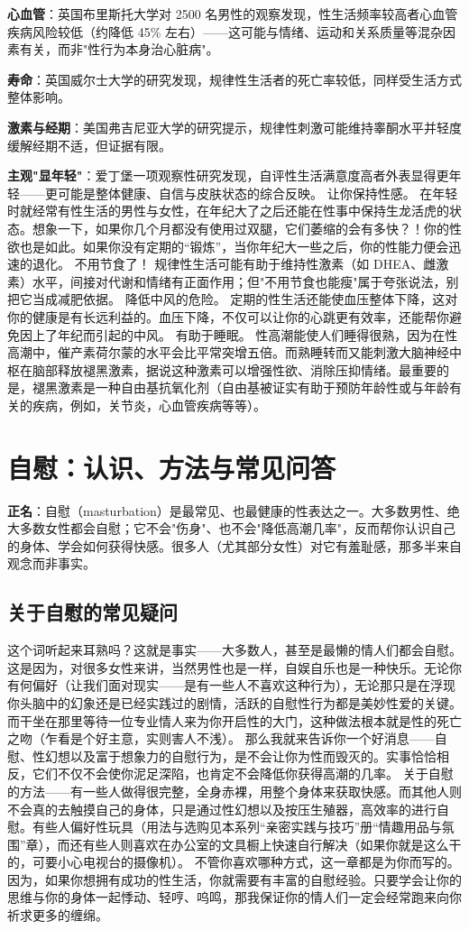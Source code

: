 \documentclass[12pt,UTF8,openany]{ctexbook}
\begin{document}
\textbf{心血管}：英国布里斯托大学对 2500 名男性的观察发现，性生活频率较高者心血管疾病风险较低（约降低 45\% 左右）——这可能与情绪、运动和关系质量等混杂因素有关，而非"性行为本身治心脏病"。

\textbf{寿命}：英国威尔士大学的研究发现，规律性生活者的死亡率较低，同样受生活方式整体影响。

\textbf{激素与经期}：美国弗吉尼亚大学的研究提示，规律性刺激可能维持睾酮水平并轻度缓解经期不适，但证据有限。

\textbf{主观"显年轻"}：爱丁堡一项观察性研究发现，自评性生活满意度高者外表显得更年轻——更可能是整体健康、自信与皮肤状态的综合反映。
让你保持性感。
在年轻时就经常有性生活的男性与女性，在年纪大了之后还能在性事中保持生龙活虎的状态。想象一下，如果你几个月都没有使用过双腿，它们萎缩的会有多快？！你的性欲也是如此。如果你没有定期的“锻炼”，当你年纪大一些之后，你的性能力便会迅速的退化。
不用节食了！
规律性生活可能有助于维持性激素（如 DHEA、雌激素）水平，间接对代谢和情绪有正面作用；但"不用节食也能瘦"属于夸张说法，别把它当成减肥依据。
降低中风的危险。
定期的性生活还能使血压整体下降，这对你的健康是有长远利益的。血压下降，不仅可以让你的心跳更有效率，还能帮你避免因上了年纪而引起的中风。
有助于睡眠。
性高潮能使人们睡得很熟，因为在性高潮中，催产素荷尔蒙的水平会比平常突增五倍。而熟睡转而又能刺激大脑神经中枢在脑部释放褪黑激素，据说这种激素可以增强性欲、消除压抑情绪。最重要的是，褪黑激素是一种自由基抗氧化剂（自由基被证实有助于预防年龄性或与年龄有关的疾病，例如，关节炎，心血管疾病等等）。

\section{自慰：认识、方法与常见问答}

\textbf{正名}：自慰（masturbation）是最常见、也最健康的性表达之一。大多数男性、绝大多数女性都会自慰；它不会"伤身"、也不会"降低高潮几率"，反而帮你认识自己的身体、学会如何获得快感。很多人（尤其部分女性）对它有羞耻感，那多半来自观念而非事实。

\subsection*{关于自慰的常见疑问}
这个词听起来耳熟吗？这就是事实——大多数人，甚至是最懒的情人们都会自慰。这是因为，对很多女性来讲，当然男性也是一样，自娱自乐也是一种快乐。无论你有何偏好（让我们面对现实——是有一些人不喜欢这种行为），无论那只是在浮现你头脑中的幻象还是已经实践过的剧情，活跃的自慰性行为都是美妙性爱的关键。而干坐在那里等待一位专业情人来为你开启性的大门，这种做法根本就是性的死亡之吻（乍看是个好主意，实则害人不浅）。
那么我就来告诉你一个好消息——自慰、性幻想以及富于想象力的自慰行为，是不会让你为性而毁灭的。实事恰恰相反，它们不仅不会使你泥足深陷，也肯定不会降低你获得高潮的几率。
关于自慰的方法——有一些人做得很完整，全身赤裸，用整个身体来获取快感。而其他人则不会真的去触摸自己的身体，只是通过性幻想以及按压生殖器，高效率的进行自慰。有些人偏好性玩具（用法与选购见本系列“亲密实践与技巧”册“情趣用品与氛围”章），而还有些人则喜欢在办公室的文具橱上快速自行解决（如果你就是这么干的，可要小心电视台的摄像机）。
不管你喜欢哪种方式，这一章都是为你而写的。因为，如果你想拥有成功的性生活，你就需要有丰富的自慰经验。只要学会让你的思维与你的身体一起悸动、轻哼、呜鸣，那我保证你的情人们一定会经常跑来向你祈求更多的缠绵。
\end{document}
